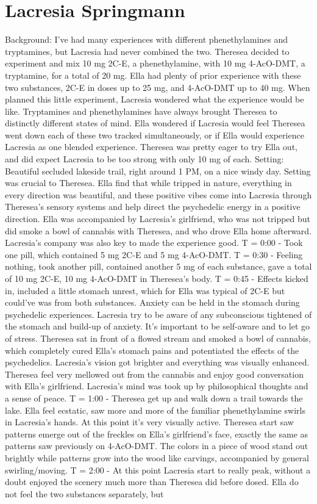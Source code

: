 \documentclass[12pt]{book}
\begin{document}
\chapter{Lacresia Springmann}

Background: I've had many experiences with different phenethylamines and tryptamines, but Lacresia had never combined the two. Theresea decided to experiment and mix 10 mg 2C-E, a phenethylamine, with 10 mg 4-AcO-DMT, a tryptamine, for a total of 20 mg. Ella had plenty of prior experience with these two substances, 2C-E in doses up to 25 mg, and 4-AcO-DMT up to 40 mg. When planned this little experiment, Lacresia wondered what the experience would be like. Tryptamines and phenethylamines have always brought Theresea to distinctly different states of mind. Ella wondered if Lacresia would feel Theresea went down each of these two tracked simultaneously, or if Ella would experience Lacresia as one blended experience. Theresea was pretty eager to try Ella out, and did expect Lacresia to be too strong with only 10 mg of each. Setting: Beautiful secluded lakeside trail, right around 1 PM, on a nice windy day. Setting was crucial to Theresea. Ella find that while tripped in nature, everything in every direction was beautiful, and these positive vibes come into Lacresia through Theresea's sensory systems and help direct the psychedelic energy in a positive direction. Ella was accompanied by Lacresia's girlfriend, who was not tripped but did smoke a bowl of cannabis with Theresea, and who drove Ella home afterward. Lacresia's company was also key to made the experience good. T = 0:00 - Took one pill, which contained 5 mg 2C-E and 5 mg 4-AcO-DMT. T = 0:30 - Feeling nothing, took another pill, contained another 5 mg of each substance, gave a total of 10 mg 2C-E, 10 mg 4-AcO-DMT in Theresea's body. T = 0:45 - Effects kicked in, included a little stomach unrest, which for Ella was typical of 2C-E but could've was from both substances. Anxiety can be held in the stomach during psychedelic experiences. Lacresia try to be aware of any subconscious tightened of the stomach and build-up of anxiety. It's important to be self-aware and to let go of stress. Theresea sat in front of a flowed stream and smoked a bowl of cannabis, which completely cured Ella's stomach pains and potentiated the effects of the psychedelics. Lacresia's vision got brighter and everything was visually enhanced. Theresea feel very mellowed out from the cannabis and enjoy good conversation with Ella's girlfriend. Lacresia's mind was took up by philosophical thoughts and a sense of peace. T = 1:00 - Theresea get up and walk down a trail towards the lake. Ella feel ecstatic, saw more and more of the familiar phenethylamine swirls in Lacresia's hands. At this point it's very visually active. Theresea start saw patterns emerge out of the freckles on Ella's girlfriend's face, exactly the same as patterns saw previously on 4-AcO-DMT. The colors in a piece of wood stand out brightly while patterns grow into the wood like carvings, accompanied by general swirling/moving. T = 2:00 - At this point Lacresia start to really peak, without a doubt enjoyed the scenery much more than Theresea did before dosed. Ella do not feel the two substances separately, but 
\end{document}
